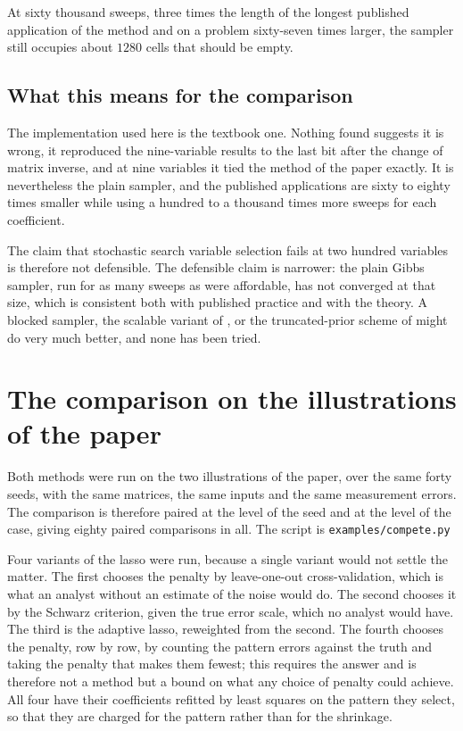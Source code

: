 At sixty thousand sweeps, three times the length of the longest published application
of the method and on a problem sixty-seven times larger, the sampler still occupies
about $1280$ cells that should be empty.

\subsection{What this means for the comparison}

The implementation used here is the textbook one. Nothing found suggests it is
wrong, it reproduced the nine-variable results to the last bit after the change of
matrix inverse, and at nine variables it tied the method of the paper exactly. It is
nevertheless the plain sampler, and the published applications are sixty to eighty
times smaller while using a hundred to a thousand times more sweeps for each
coefficient.

The claim that stochastic search variable selection fails at two hundred variables is
therefore not defensible. The defensible claim is narrower: the plain Gibbs sampler,
run for as many sweeps as were affordable, has not converged at that size, which is
consistent both with published practice and with the theory. A blocked sampler, the
scalable variant of \cite{biswas2022}, or the truncated-prior scheme of
\cite{yang2016} might do very much better, and none has been tried.

\section{The comparison on the illustrations of the paper}
\label{sec:results}

Both methods were run on the two illustrations of the paper, over the same forty
seeds, with the same matrices, the same inputs and the same measurement errors. The
comparison is therefore paired at the level of the seed and at the level of the
case, giving eighty paired comparisons in all. The script is
\texttt{examples/compete.py}

Four variants of the lasso were run, because a single variant would not settle the
matter. The first chooses the penalty by leave-one-out cross-validation, which is
what an analyst without an estimate of the noise would do. The second chooses it by
the Schwarz criterion, given the true error scale, which no analyst would have. The
third is the adaptive lasso, reweighted from the second. The fourth chooses the
penalty, row by row, by counting the pattern errors against the truth and taking the
penalty that makes them fewest; this requires the answer and is therefore not a
method but a bound on what any choice of penalty could achieve. All four have their
coefficients refitted by least squares on the pattern they select, so that they are
charged for the pattern rather than for the shrinkage.

